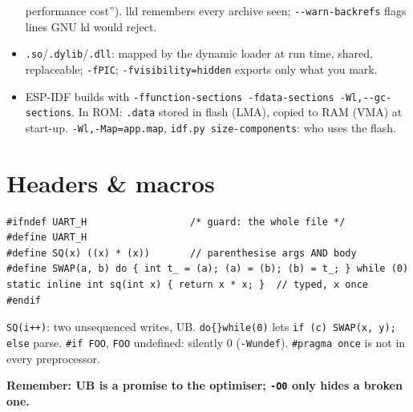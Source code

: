 \documentclass[8pt]{extarticle}
\newcommand\ct[1]{\texttt{#1}}
\begin{document}
\begin{multicols}{2}
\begin{itemize}
        performance cost''). lld remembers every archive seen; \ct{-{}-warn-backrefs} flags lines
        GNU ld would reject.
  \item \ct{.so}/\ct{.dylib}/\ct{.dll}: mapped by the dynamic loader at run time, shared,
        replaceable; \ct{-fPIC}; \ct{-fvisibility=hidden} exports only what you mark.
  \item ESP-IDF builds with \ct{-ffunction-sections -fdata-sections -Wl,-{}-gc-sections}. In ROM:
        \ct{.data} stored in flash (LMA), copied to RAM (VMA) at start-up.
        \ct{-Wl,-Map=app.map}, \ct{idf.py size-components}: who uses the flash.
\end{itemize}

\section{Headers \& macros}
\begin{lstlisting}[style=CSheet]
#ifndef UART_H                  /* guard: the whole file */
#define UART_H
#define SQ(x) ((x) * (x))       // parenthesise args AND body
#define SWAP(a, b) do { int t_ = (a); (a) = (b); (b) = t_; } while (0)
static inline int sq(int x) { return x * x; }  // typed, x once
#endif
\end{lstlisting}
\ct{SQ(i++)}: two unsequenced writes, UB. \ct{do\{\}while(0)} lets \ct{if (c) SWAP(x, y); else}
parse. \ct{\#if FOO}, \ct{FOO} undefined: silently 0 (\ct{-Wundef}). \ct{\#pragma once} is not in
every preprocessor.

\textbf{Remember: UB is a promise to the optimiser; \ct{-O0} only hides a broken one.}

\end{multicols}

\end{document}
